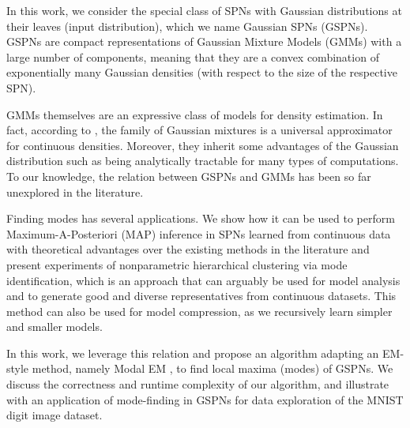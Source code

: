 \documentclass[12pt]{article}
\begin{document}

In this work, we consider the special class of SPNs with Gaussian distributions at their leaves (input distribution), which we name Gaussian SPNs (GSPNs). 
GSPNs are compact representations of Gaussian Mixture Models (GMMs) with a large number of components, meaning that they are a convex combination of exponentially many Gaussian densities (with respect to the size of the respective SPN).

GMMs themselves are an expressive class of models for density estimation. In fact, according to \cite{Carreira-Perpinan2000}, the family of Gaussian mixtures is a universal approximator for continuous densities. Moreover, they inherit some advantages of the Gaussian distribution such as being analytically tractable for many types of computations. 
To our knowledge, the relation between GSPNs and GMMs has been so far unexplored in the literature. 

Finding modes has several applications. We show how it can be used to perform Maximum-A-Posteriori (MAP) inference in SPNs learned from continuous data with theoretical advantages over the existing methods in the literature and present experiments of nonparametric hierarchical clustering via mode identification, which is an approach that can arguably be used for model analysis and to generate good and diverse representatives from continuous datasets. This method can also be used for model compression, as we recursively learn simpler and smaller models.

In this work, we leverage this relation and propose an algorithm adapting an EM-style method, namely Modal EM \cite{Li2007}, to find local maxima (modes) of GSPNs. We discuss the correctness and runtime complexity of our algorithm, and illustrate with an application of mode-finding in GSPNs for data exploration of the MNIST digit image dataset.



\end{document}
